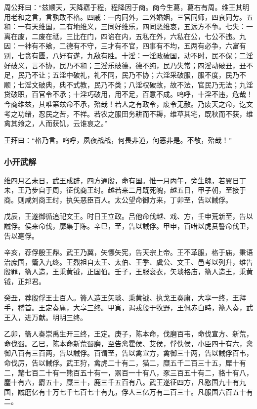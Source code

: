 \documentclass[]{article}
\begin{document}
周公拜曰：``兹顺天，天降寤于程，程降因于商。商今生葛，葛右有周。维王其明用老和之言，言孰敢不格。四戚：一内同外，二外婚姻，三官同师，四哀同劳。五和：一有天维国，二有地维义，三同好维乐，四同恶维哀，五远方不争。七失：一离在废，二废在祗，三比在门，四谄在内，五私在外，六私在公，七公不违。九因：一神有不飨，二德有不守，三才有不官，四事有不均，五两有必争，六富有别，七贪有匮，八好有遂，九敌有胜。十淫：一淫政破国，动不时，民不保；二淫好破义，言不协，民乃不和；三淫乐破德，德不纯，民乃失常；四淫动破丑，丑不足，民乃不让；五淫中破礼，礼不同，民乃不协；六淫采破服，服不度，民乃不顺；七淫文破典，典不式教，民乃不类；八淫权破故，故不法，官民乃无法；九淫贷破职，百官令不承；十淫巧破用，用不足，百意不成。呜呼，十淫不违，危哉！今商维兹，其唯第兹命不承，殆哉！若人之有政令，废令无赦。乃废天之命，讫文考之功绪，忍民之苦，不祥。若农之服田务耕而不耨，维草其宅，既秋而不获，维禽其飨之，人而获饥，云谁哀之。''

王拜曰：``格乃言。呜呼，夙夜战战，何畏非道，何恶非是。不敬，殆哉！''

\hypertarget{header-n159}{%
\subsubsection{小开武解}\label{header-n159}}

维四月乙未日，武王成辟，四方通殷，命有国。惟一月丙午，旁生魄，若翼日丁未，王乃步自于周，征伐商王纣。越若来二月既死魄，越五日，甲子朝，至接于商。则咸刘商王纣，执矢恶臣百人。太公望命御方来，丁卯至，告以馘俘。

戊辰，王遂御循追祀文王。时日王立政。吕他命伐越、戏、方，壬申荒新至，告以馘俘。侯来命伐，靡集于陈。辛巳，至，告以馘俘。甲申，百唶以虎贲誓命伐卫，告以亳俘。

辛亥，荐俘殷王鼎。武王乃翼，矢慓矢宪，告天宗上帝。王不革服，格于庙，秉语治庶国，籥入九终。王烈祖自太王、太伯、王季、虞公、文王、邑考以列升，维告殷罪，籥人造，王秉黄钺，正国伯。壬子，王服衮衣，矢琰格庙，籥人造王，秉黄钺，正邦君。

癸丑，荐殷俘王士百人。籥人造王矢琰、秉黄钺、执戈王奏庸，大享一终，王拜手，稽首。王定奏庸，大享三终。甲寅，谒戎殷于牧野，王佩赤白畤，籥人奏，武王入，进万献。明明三终。

乙卯，籥人奏崇禹生开三终，王定。庚子，陈本命，伐磨百韦，命伐宣方、新荒，命伐蜀。乙巳，陈本命新荒蜀磨，至告禽霍侯、艾侯，俘佚侯，小臣四十有六，禽御八百有三百两，告以馘俘。百谓至，告以禽宣方，禽御三十两，告以馘俘百韦，命伐厉，告以馘俘。武王狩，禽虎二十有二，猫二，糜五千二百三十五，犀十有二，氂七百二十有一熊百五十有一，罴百一十有八，豕三百五十有二，貉十有八，麈十有六，麝五十，糜三十，鹿三千五百有八。武王遂征四方，凡憝国九十有九国，馘磨亿有十万七千七百七十有九，俘人三亿万有二百三十。凡服国六百五十有二。
\end{document}
